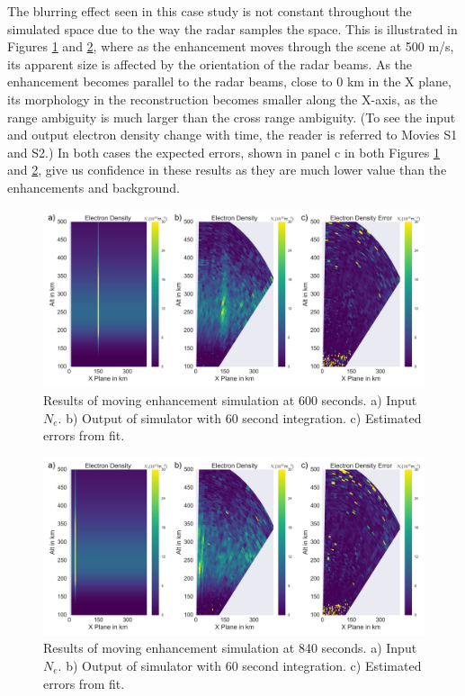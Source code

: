 \documentclass[draft,ras]{agutex}
\begin{document}
\begin{article}
The blurring effect seen in this case study is not constant throughout the simulated space due to the way the radar samples the space. This is illustrated in Figures \ref{fig:moving10mins} and \ref{fig:moving14mins}, where as the enhancement moves through the scene at 500 m/s, its apparent size is affected by the orientation of the radar beams. 
As the enhancement becomes parallel to the radar beams, close to 0 km in the X plane,
its morphology in the reconstruction becomes smaller along the X-axis, as the range ambiguity is much larger than the cross range ambiguity. (To see the input and output electron density change with time, the reader is referred to Movies S1 and S2.) In both cases the expected errors, shown in panel c in both Figures \ref{fig:moving10mins} and \ref{fig:moving14mins}, give us confidence in these results as they are much lower value than the enhancements and background.
\begin{figure}[!t]
\centering
\includegraphics[width=6in]{moving6mins}
\caption{Results of moving enhancement simulation at 600 seconds. a) Input $N_e$. b) Output of simulator with 60 second integration. c) Estimated errors from fit.}
\label{fig:moving10mins}
\end{figure}


\begin{figure}[!t]
\centering
\includegraphics[width=6in]{moving14mins}
\caption{Results of moving enhancement simulation at 840 seconds. a) Input $N_e$. b) Output of simulator with 60 second integration. c) Estimated errors from fit.}
\label{fig:moving14mins}
\end{figure}


\end{article}
\end{document}
